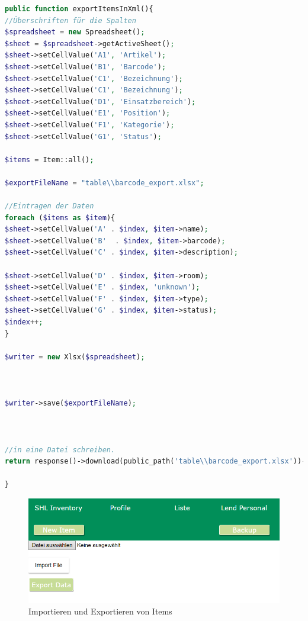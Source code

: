 \begin{lstlisting}[language=php, frame=single]
 public function exportItemsInXml(){
//Überschriften für die Spalten
$spreadsheet = new Spreadsheet();
$sheet = $spreadsheet->getActiveSheet();
$sheet->setCellValue('A1', 'Artikel');
$sheet->setCellValue('B1', 'Barcode');
$sheet->setCellValue('C1', 'Bezeichnung');
$sheet->setCellValue('C1', 'Bezeichnung');
$sheet->setCellValue('D1', 'Einsatzbereich');
$sheet->setCellValue('E1', 'Position');
$sheet->setCellValue('F1', 'Kategorie');
$sheet->setCellValue('G1', 'Status');

$items = Item::all();

$exportFileName = "table\\barcode_export.xlsx";

//Eintragen der Daten
foreach ($items as $item){
$sheet->setCellValue('A' . $index, $item->name);
$sheet->setCellValue('B'  . $index, $item->barcode);
$sheet->setCellValue('C' . $index, $item->description);

$sheet->setCellValue('D' . $index, $item->room);
$sheet->setCellValue('E' . $index, 'unknown');
$sheet->setCellValue('F' . $index, $item->type);
$sheet->setCellValue('G' . $index, $item->status);
$index++;
}

$writer = new Xlsx($spreadsheet);



$writer->save($exportFileName);



//in eine Datei schreiben.
return response()->download(public_path('table\\barcode_export.xlsx'))->deleteFileAfterSend();

}
\end{lstlisting}

\begin{figure}[H]
	\centering
	\includegraphics[scale=0.5]{content/pictures/backup.png}
	\caption{ Importieren und Exportieren von Items}
	\label{fig:backup}
\end{figure}

